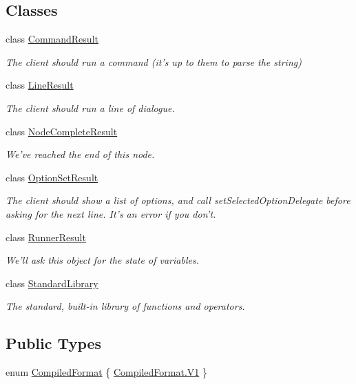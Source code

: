 \subsection*{Classes}
\begin{DoxyCompactItemize}
\item 
class \hyperlink{a00051}{Command\-Result}
\begin{DoxyCompactList}\small\item\em The client should run a command (it's up to them to parse the string) \end{DoxyCompactList}\item 
class \hyperlink{a00126}{Line\-Result}
\begin{DoxyCompactList}\small\item\em The client should run a line of dialogue. \end{DoxyCompactList}\item 
class \hyperlink{a00132}{Node\-Complete\-Result}
\begin{DoxyCompactList}\small\item\em We've reached the end of this node. \end{DoxyCompactList}\item 
class \hyperlink{a00136}{Option\-Set\-Result}
\begin{DoxyCompactList}\small\item\em The client should show a list of options, and call set\-Selected\-Option\-Delegate before asking for the next line. It's an error if you don't. \end{DoxyCompactList}\item 
class \hyperlink{a00143}{Runner\-Result}
\begin{DoxyCompactList}\small\item\em We'll ask this object for the state of variables. \end{DoxyCompactList}\item 
class \hyperlink{a00149}{Standard\-Library}
\begin{DoxyCompactList}\small\item\em The standard, built-\/in library of functions and operators. \end{DoxyCompactList}\end{DoxyCompactItemize}
\subsection*{Public Types}
\begin{DoxyCompactItemize}
\item 
enum \hyperlink{a00090_a903f18cdcc66c28ceab5a43c41fe074d}{Compiled\-Format} \{ \hyperlink{a00090_a903f18cdcc66c28ceab5a43c41fe074dab4daca084ad9eabfc8de231929477ed6}{Compiled\-Format.\-V1}
 \}
\end{DoxyCompactItemize}
